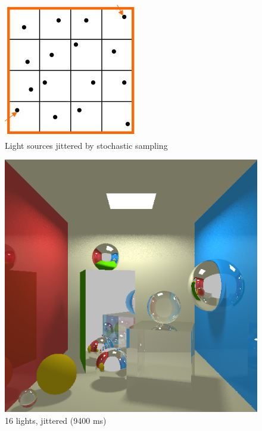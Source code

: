 \begin{figure}[H]
\centering
\includegraphics[width=0.25\linewidth]{img/shadows/light2.jpg}
\caption{Light sources jittered by stochastic sampling}
\label{fig:light_jittered}
\end{figure}

\begin{figure}[H]
    \centering
    \includegraphics[width=\linewidth]{img/shadows/16_jittered.png}
    \caption{16 lights, jittered (9400 ms)}
\endminipage\hfill
{}
    \centering

\end{figure}
